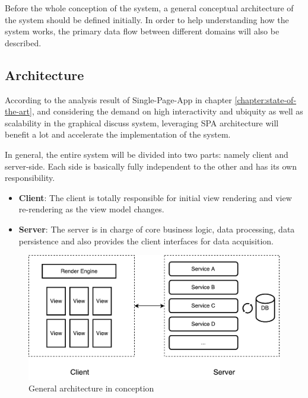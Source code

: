 Before the whole conception of the system, a general conceptual architecture of the system should be defined initially. In order to help understanding how the system works, the primary data flow between different domains will also be described.

\subsection{Architecture} \label{sec:concept-general-architecture}
According to the analysis result of Single-Page-App in chapter \ref{chapter:state-of-the-art}, and considering the demand on high interactivity and ubiquity as well as scalability in the graphical discuss system, leveraging SPA architecture will benefit a lot and accelerate the implementation of the system. 

In general, the entire system will be divided into two parts: namely client and server-side. Each side is basically fully independent to the other and has its own responsibility. 

\begin{itemize}
\item
\textbf{Client}: The client is totally responsible for initial view rendering and view re-rendering as the view model changes. 
\item
\textbf{Server}: The server is in charge of core business logic, data processing, data persistence and also provides the client interfaces for data acquisition.
\end{itemize}

\begin{figure}[!htbp]
  \centering
    \includegraphics[width=1\textwidth]{Figures/concept-general-architecture.pdf}
  \caption{General architecture in conception}
  \label{fig:general-architecture-concept}
\end{figure}


